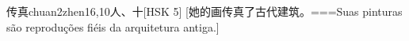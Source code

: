 \begin{EntryWithPhonetic}{传真}{chuan2zhen1}{6,10}{⼈、⼗}[HSK 5]
  [她的画传真了古代建筑。===Suas pinturas são reproduções fiéis da arquitetura antiga.]
\end{EntryWithPhonetic}
